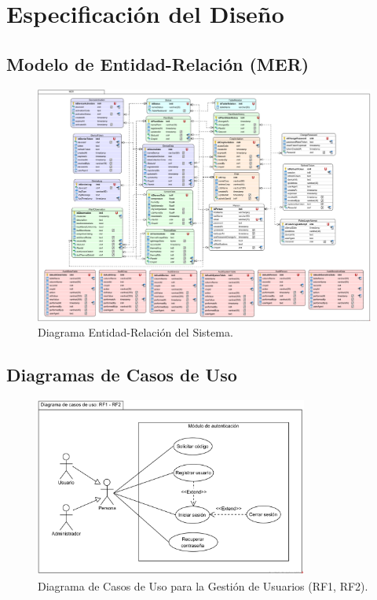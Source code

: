 
\section{Especificación del Diseño}

\subsection{Modelo de Entidad-Relación (MER)}
\begin{figure}[H]
    \centering
    \caption{Diagrama Entidad-Relación del Sistema.}
    \label{fig:der}
    \includegraphics[width=1\textwidth]{UML/Otros/Diagrama Entidad Relacion.png}
\end{figure}


\subsection{Diagramas de Casos de Uso}

\begin{figure}[H]
    \centering
    \caption{Diagrama de Casos de Uso para la Gestión de Usuarios (RF1, RF2).}
    \label{fig:casos-uso-usuarios} %
    \includegraphics[width=0.8\textwidth]{UML/CasosUso/Diagrama de Casos de Uso RF1 RF2.png}
\end{figure}


